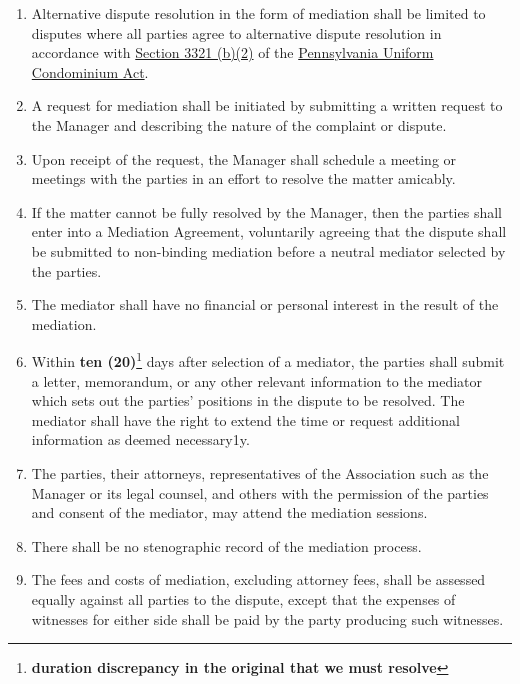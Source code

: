 \documentclass[
]{book}
\begin{document}
\begin{enumerate}
\def\labelenumi{\arabic{enumi}.}
\item
  Alternative dispute resolution in the form of mediation shall be limited to disputes where all parties agree to alternative dispute resolution in accordance with \href{https://www.legis.state.pa.us/cfdocs/legis/LI/consCheck.cfm?txtType=HTM\&ttl=68\&div=0\&chpt=33\&sctn=21\&subsctn=0}{Section 3321 (b)(2)} of the \href{https://www.legis.state.pa.us/cfdocs/legis/LI/consCheck.cfm?txtType=HTM\&ttl=68f}{Pennsylvania Uniform Condominium Act}.
\item
  A request for mediation shall be initiated by submitting a written request to the Manager and describing the nature of the complaint or dispute.
\item
  Upon receipt of the request, the Manager shall schedule a meeting or meetings with the parties in an effort to resolve the matter amicably.
\item
  If the matter cannot be fully resolved by the Manager, then the parties shall enter into a Mediation Agreement, voluntarily agreeing that the dispute shall be submitted to non-binding mediation before a neutral mediator selected by the parties.
\item
  The mediator shall have no financial or personal interest in the result of the mediation.
\item
  Within \textbf{ten (20)}\footnote{\textbf{duration discrepancy in the original that we must resolve}} days after selection of a mediator, the parties shall submit a letter, memorandum, or any other relevant information to the mediator which sets out the parties' positions in the dispute to be resolved. The mediator shall have the right to extend the time or request additional information as deemed necessary1y.
\item
  The parties, their attorneys, representatives of the Association such as the Manager or its legal counsel, and others with the permission of the parties and consent of the mediator, may attend the mediation sessions.
\item
  There shall be no stenographic record of the mediation process.
\item
  The fees and costs of mediation, excluding attorney fees, shall be assessed equally against all parties to the dispute, except that the expenses of witnesses for either side shall be paid by the party producing such witnesses.
\end{enumerate}
\end{document}
